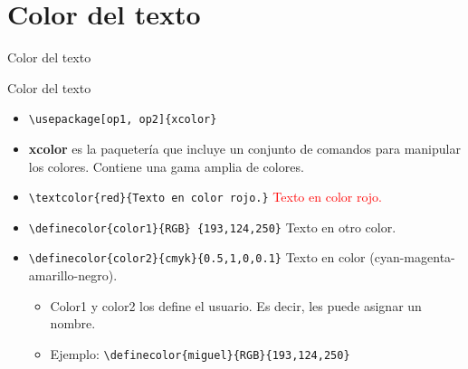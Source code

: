 \documentclass[aspectratio=169, 10pt]{beamer}
\begin{document}
\section{Color del texto}
\begin{frame}[fragile]{Color del texto}
  
            \begin{block}{Color del texto}
            \begin{itemize} \pause
                \item \verb|\usepackage[op1, op2]{xcolor}| \pause
                \item \textbf{xcolor} es la paquetería que incluye un conjunto de comandos para manipular los colores. Contiene una gama amplia de colores. \pause
                \item \verb|\textcolor{red}{Texto en color rojo.}| \textcolor{red}{Texto en color rojo.} \pause
                \item \verb|\definecolor{color1}{RGB} {193,124,250}|  \textcolor{color1}{Texto en otro color.} \pause
                \item \verb|\definecolor{color2}{cmyk}{0.5,1,0,0.1}| \textcolor{color2}{Texto en color (cyan-magenta-amarillo-negro).}
            
            \begin{itemize} \pause
                \item \textcolor{miguel}{Color1 y color2 los define el usuario. Es decir, les puede asignar un nombre}.
                \item Ejemplo: \verb|\definecolor{miguel}{RGB}{193,124,250}|
                
            \end{itemize}
            \end{itemize}
        
         
         
\end{block} 


\end{frame}
\end{document}
